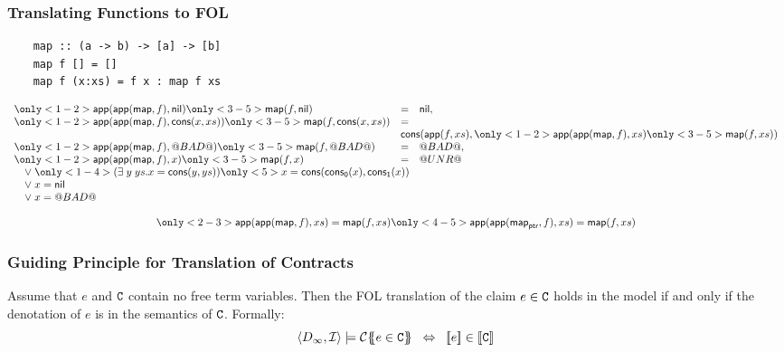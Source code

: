 \documentclass[serif,professionalfont]{beamer}
\begin{document}
\begin{frame}[fragile]
  \frametitle{Translating Functions to FOL}

  \begin{verbatim}
    map :: (a -> b) -> [a] -> [b]
    map f [] = []
    map f (x:xs) = f x : map f xs
  \end{verbatim}

  \newcommand\cmap[2]{
    \only<1-2>{\appp{\maps}{#1}{#2}}
    \only<3-5>{\map{#1}{#2}}
  }

  \[\begin{array}{lll}
  \cmap{f}{\nil}         & = & \nil, \\
  \cmap{f}{\cons{x}{xs}} & = & \\
                         & \multicolumn{2}{l}{\cons{\app{f}{xs}}{\cmap{f}{xs}}}  \\
  \cmap{f}{\bad}         & = & \bad, \\
  \cmap{f}{x}            & = & \unr \\
  \multicolumn{3}{l}{\quad \lor \; \only<1-4>{(\exists \; y \; ys . x = \cons{y}{ys})}
                                   \only<5>{x = \cons{\conspi{x}}{\conspii{x}}}} \\
  \multicolumn{3}{l}{\quad \lor \; x = \nil} \\
  \multicolumn{3}{l}{\quad \lor \; x = \bad} \\
  \\
  \multicolumn{3}{c}{
    \only<2-3>{\appp{\maps}{f}{xs} = \map{f}{xs}}
    \only<4-5>{\appp{\ptr{\maps}}{f}{xs} = \map{f}{xs}}
  }
  \end{array}\]
\end{frame}

\begin{frame}[fragile]
  \frametitle{Guiding Principle for Translation of Contracts}

  \begin{theorem}
    Assume that $e$ and ${\tt C}$ contain no free term variables. Then
    the FOL translation of the claim $e \in {\tt C}$ holds in the model
    if and only if the denotation of $e$ is in the semantics of
    ${\tt C}$.  Formally:
    $$\langle D_\infty,{\cal I}\rangle \models \trc{e \in \Ct}
      \;\; \Leftrightarrow \;\; \dbrace{e} \in \dbrace{\Ct}
    $$
  \end{theorem}
\end{frame}
\end{document}
